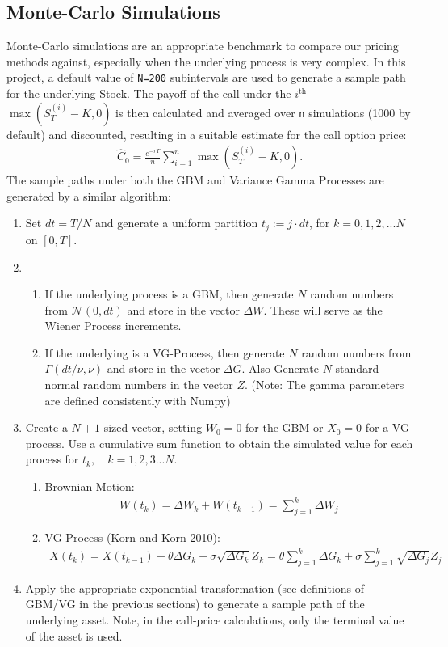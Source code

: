 \documentclass[11pt]{article}
\begin{document}
		\subsection{Monte-Carlo Simulations}
		Monte-Carlo simulations are an appropriate benchmark to compare our pricing methods against, especially when the underlying process is very complex. In this project, a default value of \texttt{N=200} subintervals are used to generate a sample path for the underlying Stock. The payoff of the call under the \( i^{\text{th}} \) \( \max\left(S^{(i)}_T - K, 0\right) \) is then calculated and averaged over \texttt{n} simulations (1000 by default) and discounted, resulting in a suitable estimate for the call option price:
		\begin{align*}
			\hat{C}_{0} = \frac{e^{-rT}}{n}\sum_{i = 1}^{n}\max\left(S^{(i)}_{T} - K, 0\right).	
			\end{align*}
		The sample paths under both the GBM and Variance Gamma Processes are generated by a similar algorithm:
		\begin{enumerate}
			\item Set \( dt = T/N \) and generate a uniform partition \( t_j := j\cdot dt \), for \( k = 0, 1,2,...N \) on \( [0, T] \).
			\item \begin{enumerate}
				\item If the underlying process is a GBM, then generate \( N \) random numbers from \(\mathcal{N}(0, dt)  \) and store in the vector \( \Delta W \). These will serve as the Wiener Process increments.
				\item If the underlying is a VG-Process, then generate \( N \) random numbers from \( \Gamma(dt/\nu, \nu) \) and store in the vector \( \Delta G \). Also Generate \( N \) standard-normal random numbers in the vector \( Z \). (Note: The gamma parameters are defined consistently with Numpy)
			\end{enumerate}
			\item Create a \( N+1 \) sized vector, setting \( W_0 = 0 \) for the GBM or \( X_0 = 0 \) for a VG process. Use a cumulative sum function to obtain the simulated value for each process for \( t_k,\quad k=1,2,3...N \).
			\begin{enumerate}
				\item Brownian Motion:
				\begin{align*}
					W(t_k) = \Delta W_k + W(t_{k - 1}) = \sum_{j = 1}^{k}\Delta W_j
				\end{align*}
				\item VG-Process (Korn and Korn 2010):
				\begin{align*}
					X(t_k) = X(t_{k - 1}) + \theta \Delta G_{k} + \sigma \sqrt{\Delta G_{k}} Z_{k} = \theta\sum_{j = 1}^{k}\Delta G_{k} + \sigma\sum_{j = 1}^{k}\sqrt{\Delta G_{j}} Z_{j}
				\end{align*}
				\end{enumerate}
			\item Apply the appropriate exponential transformation (see definitions of GBM/VG in the previous sections) to generate a sample path of the underlying asset. Note, in the call-price calculations, only the terminal value of the asset is used. 
		\end{enumerate}
\end{document}
